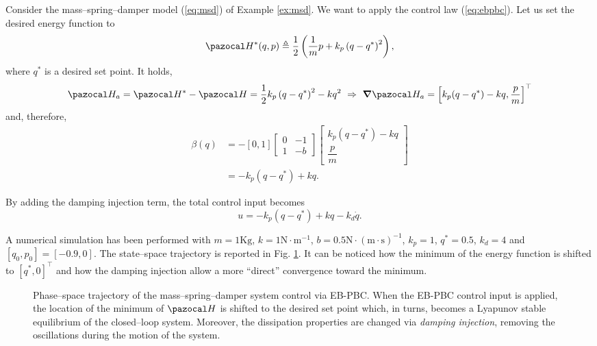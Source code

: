 \begin{exmp}
    Consider the mass--spring--damper model (\ref{eq:msd}) of Example \ref{ex:msd}. We want to apply the control law (\ref{eq:ebpbc}).  Let us set the desired energy function to 
    \begin{equation}
        \Ha^*(q,p)\triangleq \frac{1}{2}\left(\frac{1}{m}p + k_p\left(q-q^*\right)^2\right),
    \end{equation}
    where $q^*$ is a desired set point. It holds,
    \begin{equation}
        \Ha_a = \Ha^* - \Ha = \frac{1}{2}k_p\left(q-q^*\right)^2 - kq^2~\Rightarrow~\bm\nabla\Ha_a = \left[k_p(q-q^*) - kq,\dfrac{p}{m}\right]^\top
    \end{equation}
    and, therefore,
    \begin{align}
        \beta(q) &= -[0,1]\begin{bmatrix}0&-1\\1&-b\end{bmatrix}\begin{bmatrix}k_p(q-q^*) - kq\\\dfrac{p}{m}\end{bmatrix}\\
                 &= -k_p(q-q^*) + kq. 
    \end{align}
    
    By adding the damping injection term, the total control input becomes
    \begin{equation}
        u = -k_p(q-q^*) + kq - k_d\dot{q}.
    \end{equation}
    
    A numerical simulation has been performed with $m = 1\text{Kg}$, $k = 1\text{N}\cdot\text{m}^{-1}$, $b = 0.5\text{N}\cdot(\text{m}\cdot\text{s})^{-1}$, $k_p = 1$, $q^* = 0.5$, $k_d = 4$ and $[q_0,p_0] = [-0.9,0]$. The state--space trajectory is reported in Fig. \ref{fig:ebpbc}. It can be noticed how the minimum of the energy function is shifted to $[q^*,0]^\top$ and how the damping injection allow a more ``direct'' convergence toward the minimum.
    \begin{figure}[!ht]
        \centering
        
        \caption[Phase--space trajectory of the mass--spring--damper system control via EB-PBC.]{Phase--space trajectory of the mass--spring--damper system control via EB-PBC. When the EB-PBC control input is applied, the location of the minimum of $\Ha$ is shifted to the desired set point which, in turns, becomes a Lyapunov stable equilibrium of the closed--loop system. Moreover, the dissipation properties are changed via \textit{damping injection}, removing the oscillations during the motion of the system.}
        \label{fig:ebpbc}
    \end{figure}
\end{exmp}
%
\clearpage